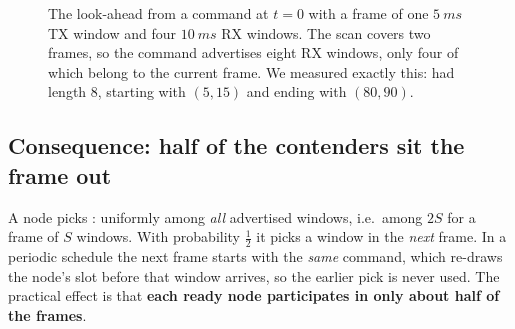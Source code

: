 \begin{figure}[t]
\centering
{}
\caption[RX-slot look-ahead: a command at $t=0$ advertises eight windows for a four-window frame]{The look-ahead from a command at $t=0$ with a frame of one $\SI{5}{ms}$ TX window and four $\SI{10}{ms}$ RX windows. The scan covers two frames, so the command advertises eight RX windows, only four of which belong to the current frame. We measured exactly this:  had length $8$, starting with $(5,15)$ and ending with $(80,90)$.}
\label{fig:lookahead}
\end{figure}

\subsection{Consequence: half of the contenders sit the frame out}
\label{sec:halffr}

A node picks : uniformly among \emph{all} advertised windows, i.e.\ among $2S$ for a frame of $S$ windows. With probability $\tfrac12$ it picks a window in the \emph{next} frame. In a periodic schedule the next frame starts with the \emph{same} command, which re-draws the node's slot before that window arrives, so the earlier pick is never used. The practical effect is that \textbf{each ready node participates in only about half of the frames}.

